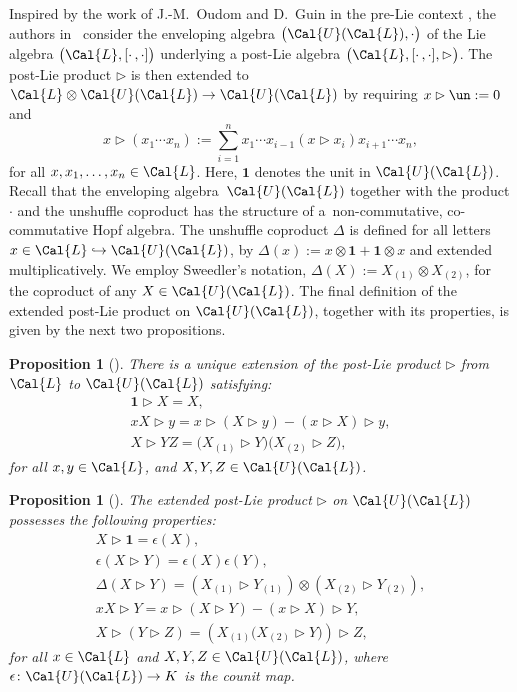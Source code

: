 \documentclass[pdftex]{sigma}
\numberwithin{equation}{section}
\newtheorem{Proposition}[Theorem]{Proposition}
 { \theoremstyle{definition}
\newtheorem{Definition}[Theorem]{Definition}
\newtheorem{Note}[Theorem]{Note}
\newtheorem{Example}[Theorem]{Example}
\newtheorem{Remark}[Theorem]{Remark} }
\begin{document}
Inspired by the work of J.-M.~Oudom and D.~Guin in the pre-Lie context \cite{OG2008}, the authors in~\cite{ELM2015} consider the enveloping algebra $\big(\Cal{U}(\Cal{L}),\cdot\big)$ of the Lie algebra $\big(\Cal{L}, [\cdot\,,\cdot ]\big)$ underlying a post-Lie algebra $\big(\Cal{L}, [\cdot\,,\cdot ],\rhd\big)$. The post-Lie product $\rhd$ is then extended to $\Cal{L} \otimes \Cal{U}(\Cal{L}) \rightarrow \Cal{U}(\Cal{L})$ by requiring $x\rhd\un:=0$ and
\begin{displaymath}
x\rhd(x_1\cdots x_n) := \sum_{i=1}^{n}{x_1 \cdots x_{i-1}(x \rhd x_i)x_{i+1}\cdots x_n},
\end{displaymath}
for all $x, x_1, \ldots, x_n \in \Cal{L}$. Here, $\mathbf{1}$ denotes the unit in $\Cal{U}(\Cal{L})$. Recall that the enveloping alge\-bra~$\Cal{U}(\Cal{L})$ together with the product $\cdot$ and the unshuffle coproduct has the structure of a~non-commutative, co-commutative Hopf algebra. The unshuffle coproduct $\Delta$ is defined for all letters $x \in \Cal{L} \hookrightarrow \Cal{U}(\Cal{L})$, by $\Delta(x):= x \otimes \mathbf{1} + \mathbf{1} \otimes x$ and extended multiplicatively. We employ Sweedler's notation, $\Delta(X):= X_{(1)} \otimes X_{(2)}$, for the coproduct of any $X \in \Cal{U}(\Cal{L})$. The final defi\-ni\-tion of the extended post-Lie product on $\Cal{U}(\Cal{L})$, together with its properties, is given by the next two propositions.
\begin{Proposition}[{\cite[Proposition 3.1]{ELM2015}}]%
There is a unique extension of the post-Lie product $\rhd$ from $\Cal{L}$ to $\Cal{U}(\Cal{L})$ satisfying:
\begin{gather*}
\mathbf{1} \rhd X = X,
\\
x X \rhd y = x \rhd (X \rhd y) - (x \rhd X) \rhd y,
\\
X \rhd Y Z = \big(X_{(1)} \rhd Y\big)\big(X_{(2)} \rhd Z\big),
\end{gather*}
for all $x, y \in \Cal{L}$, and $X, Y, Z \in \Cal{U}(\Cal{L})$.
\end{Proposition}

\begin{Proposition}[{\cite[Proposition 3.2]{ELM2015}}]
\label{prop:2}
The extended post-Lie product $\rhd$ on $\Cal{U}(\Cal{L})$ possesses the following properties:
\begin{gather*}
X \rhd \mathbf{1} = \epsilon(X),
\\
\epsilon(X \rhd Y) = \epsilon(X)\epsilon(Y),
\\
\Delta(X \rhd Y) = (X_{(1)} \rhd Y_{(1)}) \otimes (X_{(2)} \rhd Y_{(2)}),
\\
x X \rhd Y = x \rhd (X \rhd Y) - (x \rhd X) \rhd Y,
\\
X \rhd (Y \rhd Z) = (X_{(1)}\big(X_{(2)} \rhd Y\big)) \rhd Z,
\end{gather*}
for all $x \in \Cal{L}$ and $X, Y, Z \in \Cal{U}(\Cal{L})$, where $\epsilon\colon \Cal{U}(\Cal{L}) \rightarrow K$ is the counit map.
\end{Proposition}
\end{document}
